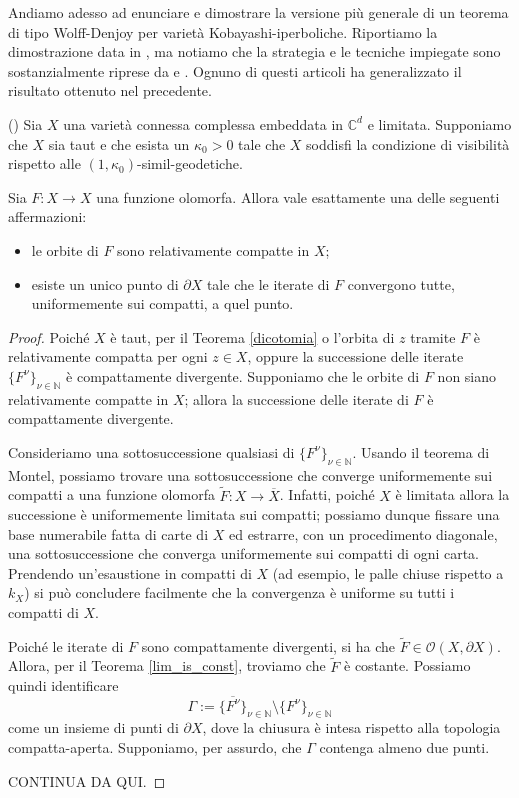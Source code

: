 Andiamo adesso ad enunciare e dimostrare la versione più generale di un teorema di tipo Wolff-Denjoy per varietà Kobayashi-iperboliche. Riportiamo la dimostrazione data in \cite{CMS}, ma notiamo che la strategia e le tecniche impiegate sono sostanzialmente riprese da \cite{BZ1} e \cite{BM}. Ognuno di questi articoli ha generalizzato il risultato ottenuto nel precedente.

\begin{thm}
    (\cite[Theorem 1.15]{CMS}) Sia $X$ una varietà connessa complessa embeddata in $\mathbb{C}^d$ e limitata. Supponiamo che $X$ sia taut e che esista un $\kappa_0>0$ tale che $X$ soddisfi la condizione di visibilità rispetto alle $(1,\kappa_0)$-simil-geodetiche.
    
    Sia $F:X \longrightarrow X$ una funzione olomorfa. Allora vale esattamente una delle seguenti affermazioni:
    \begin{itemize}
        \item le orbite di $F$ sono relativamente compatte in $X$;
        \item esiste un unico punto di $\partial X$ tale che le iterate di $F$ convergono tutte, uniformemente sui compatti, a quel punto.
    \end{itemize}
\end{thm}

\begin{proof}
    Poiché $X$ è taut, per il Teorema \ref{dicotomia} o l'orbita di $z$ tramite $F$ è relativamente compatta per ogni $z \in X$, oppure la successione delle iterate $\{F^\nu\}_{\nu\in\mathbb{N}}$ è compattamente divergente. Supponiamo che le orbite di $F$ non siano relativamente compatte in $X$; allora la successione delle iterate di $F$ è compattamente divergente.

    Consideriamo una sottosuccessione qualsiasi di $\{F^\nu\}_{\nu\in\mathbb{N}}$. Usando il teorema di Montel, possiamo trovare una sottosuccessione che converge uniformemente sui compatti a una funzione olomorfa $\tilde{F}:X \rightarrow \overline{X}$. Infatti, poiché $X$ è limitata allora la successione è uniformemente limitata sui compatti; possiamo dunque fissare una base numerabile fatta di carte di $X$ ed estrarre, con un procedimento diagonale, una sottosuccessione che converga uniformemente sui compatti di ogni carta. Prendendo un'esaustione in compatti di $X$ (ad esempio, le palle chiuse rispetto a $k_X$) si può concludere facilmente che la convergenza è uniforme su tutti i compatti di $X$.

    Poiché le iterate di $F$ sono compattamente divergenti, si ha che $\tilde{F}\in\mathcal{O}(X,\partial X)$. Allora, per il Teorema \ref{lim_is_const}, troviamo che $\tilde{F}$ è costante. Possiamo quindi identificare
    $$\Gamma:=\overline{\{F^\nu\}}_{\nu\in\mathbb{N}}\setminus\{F^\nu\}_{\nu\in\mathbb{N}}$$
    come un insieme di punti di $\partial X$, dove la chiusura è intesa rispetto alla topologia compatta-aperta. Supponiamo, per assurdo, che $\Gamma$ contenga almeno due punti.

    CONTINUA DA QUI.
\end{proof}